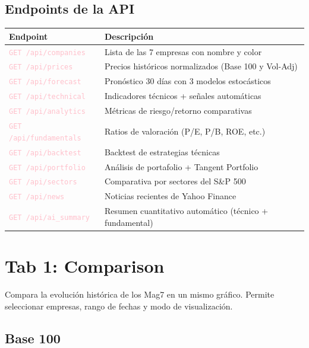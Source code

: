 \documentclass[11pt, a4paper]{article}
\newcommand{\api}[1]{\texttt{\textcolor{pink}{#1}}}
\begin{document}
\subsection{Endpoints de la API}

\begin{tabularx}{\textwidth}{lX}
  \toprule
  \textbf{Endpoint} & \textbf{Descripción} \\
  \midrule
  \api{GET /api/companies}              & Lista de las 7 empresas con nombre y color \\
  \api{GET /api/prices}                 & Precios históricos normalizados (Base 100 y Vol-Adj) \\
  \api{GET /api/forecast}               & Pronóstico 30 días con 3 modelos estocásticos \\
  \api{GET /api/technical}              & Indicadores técnicos + señales automáticas \\
  \api{GET /api/analytics}              & Métricas de riesgo/retorno comparativas \\
  \api{GET /api/fundamentals}           & Ratios de valoración (P/E, P/B, ROE, etc.) \\
  \api{GET /api/backtest}               & Backtest de estrategias técnicas \\
  \api{GET /api/portfolio}              & Análisis de portafolio + Tangent Portfolio \\
  \api{GET /api/sectors}                & Comparativa por sectores del S\&P 500 \\
  \api{GET /api/news}                   & Noticias recientes de Yahoo Finance \\
  \api{GET /api/ai\_summary}            & Resumen cuantitativo automático (técnico + fundamental) \\
  \bottomrule
\end{tabularx}

\newpage

\section{Tab 1: Comparison}

Compara la evolución histórica de los Mag7 en un mismo gráfico. Permite seleccionar empresas, rango de fechas y modo de visualización.

\subsection{Base 100}
\end{document}
